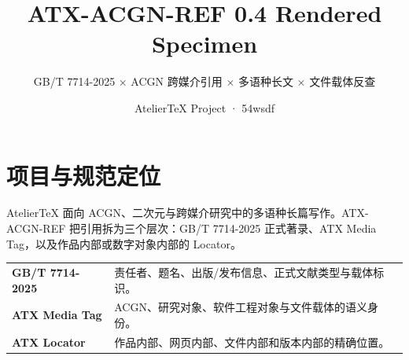 \documentclass[profile=editorial,titlelayout=\AtelierSpecimenTitleLayout]{atelier}
\title{ATX-ACGN-REF 0.4 Rendered Specimen}
\subtitle{GB/T 7714-2025 × ACGN 跨媒介引用 × 多语种长文 × 文件载体反查}
\author{AtelierTeX Project · 54wsdf}
\begin{document}
\maketitle

\section{项目与规范定位}
AtelierTeX 面向 ACGN、二次元与跨媒介研究中的多语种长篇写作。ATX-ACGN-REF 把引用拆为三个层次：GB/T 7714-2025 正式著录、ATX Media Tag，以及作品内部或数字对象内部的 Locator。


\begin{tabularx}{\textwidth}{@{}p{40mm}Y@{}}
\textbf{GB/T 7714-2025} & 责任者、题名、出版/发布信息、正式文献类型与载体标识。\\
\textbf{ATX Media Tag} & ACGN、研究对象、软件工程对象与文件载体的语义身份。\\
\textbf{ATX Locator} & 作品内部、网页内部、文件内部和版本内部的精确位置。\\
\end{tabularx}
\end{document}
